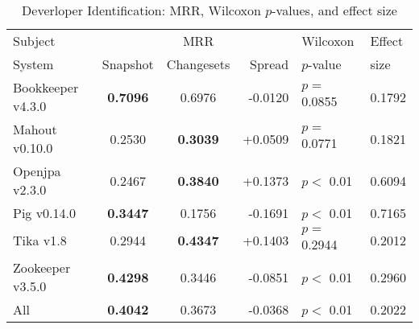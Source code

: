 \begin{table}[t]
\centering
\caption{Deverloper Identification: MRR, Wilcoxon $p$-values, and effect size}
\begin{tabular}{l|ccr|ll}
\toprule
Subject & & MRR & & Wilcoxon & Effect \\
System  &  Snapshot & Changesets & Spread & $p$-value & size \\
\midrule
Bookkeeper v4.3.0 & {\bf 0.7096 } & 0.6976 & -0.0120 & $p = $ 0.0855 & 0.1792 \\
Mahout v0.10.0 & 0.2530 & {\bf 0.3039 } & +0.0509 & $p = $ 0.0771 & 0.1821 \\
Openjpa v2.3.0 & 0.2467 & {\bf 0.3840 } & +0.1373 & $p < $ 0.01 & 0.6094 \\
Pig v0.14.0 & {\bf 0.3447 } & 0.1756 & -0.1691 & $p < $ 0.01 & 0.7165 \\
Tika v1.8 & 0.2944 & {\bf 0.4347 } & +0.1403 & $p = $ 0.2944 & 0.2012 \\
Zookeeper v3.5.0 & {\bf 0.4298 } & 0.3446 & -0.0851 & $p < $ 0.01 & 0.2960 \\
\midrule
All & {\bf 0.4042 } & 0.3673 & -0.0368 & $p < $ 0.01 & 0.2022 \\
\bottomrule
\end{tabular}
\label{table:triage_rq1}
\end{table}
